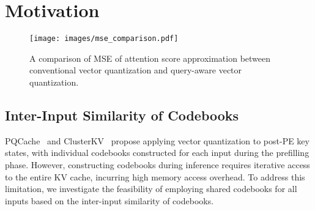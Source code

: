 \section{Motivation}

\begin{figure}[t]
    \centering
    \texttt{[image: images/mse\_comparison.pdf]}
    \caption{A comparison of MSE of attention score approximation between conventional vector quantization and query-aware vector quantization.}
    \label{fig:attention_score_mse}
\end{figure}




\subsection{Inter-Input Similarity of Codebooks}

\label{sec:codebook_sharing}

PQCache~\citep{pqcache} and ClusterKV~\citep{clusterkv} propose applying vector quantization to post-PE key states, with individual codebooks constructed for each input during the prefilling phase.
However, constructing codebooks during inference requires iterative access to the entire KV cache, incurring high memory access overhead.
To address this limitation, we investigate the feasibility of employing shared codebooks for all inputs based on the inter-input similarity of codebooks.

